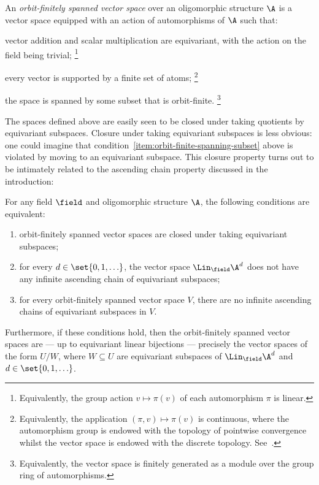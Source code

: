 \begin{definition}\label{def:orbit-finitely-spanned-abstract}
    An \emph{orbit-finitely spanned vector space} over an oligomorphic structure $\A$ is a vector space equipped with an action of automorphisms of $\A$ such that: 
    \begin{bracketenumerate}
        \item
        vector addition and scalar multiplication are equivariant, with the action on the field being trivial;%
        \footnote{Equivalently, the group action $v \mapsto \pi(v)$ of each automorphism $\pi$ is linear.}

        \item 
        every vector is supported by a finite set of atoms;%
        \footnote{Equivalently, the application $(\pi, v) \mapsto \pi(v)$ is continuous, where the automorphism group is endowed with the topology of pointwise convergence whilst the vector space is endowed with the discrete topology. 
        See~\cite[Lemma~4.1.5]{hodges1993model}.}

        \item \label{item:orbit-finite-spanning-subset} 
        the space is spanned by some subset that is orbit-finite.%
        \footnote{Equivalently, the vector space is finitely generated as a module over the group ring of automorphisms.}
    \end{bracketenumerate}
\end{definition}

The spaces defined above are easily seen to be closed under taking quotients by equivariant subspaces. 
Closure under taking equivariant subspaces is less obvious: 
one could imagine that condition~\eqref{item:orbit-finite-spanning-subset} above is violated by moving to an equivariant subspace. 
This closure property turns out to be intimately related to the ascending chain property discussed in the introduction:

\begin{theorem}\label{thm:ACP}
    For any field $\field$ and oligomorphic structure $\A$, the following conditions are equivalent: 
    \begin{enumerate}
        \item orbit-finitely spanned vector spaces are closed under taking equivariant subspaces; 
        \item for every $d \in \set{0,1,\ldots}$,  the vector space 
        $
            \Lin_\field \A^d
        $ does not have any infinite ascending chain of equivariant subspaces;
        \item for every orbit-finitely spanned vector space $V$, there are no infinite ascending chains of equivariant subspaces in $V$.
    \end{enumerate}
    Furthermore, if these conditions hold, then the orbit-finitely spanned vector spaces are --- up to equivariant linear bijections --- precisely the vector spaces of the form $U/W$, 
    where $W \subseteq U$ are equivariant subspaces of $\Lin_\field \A^d$ and $d \in \set{0,1,\ldots}$.
\end{theorem}


